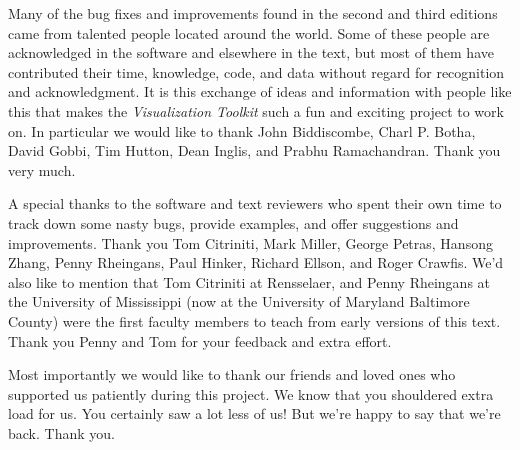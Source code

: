 Many of the bug fixes and improvements found in the second and third editions came from talented people located around the world. Some of these people are acknowledged in the software and elsewhere in the text, but most of them have contributed their time, knowledge, code, and data without regard for recognition and acknowledgment. It is this exchange of ideas and information with people like this that makes the \emph{Visualization Toolkit} such a fun and exciting project to work on. In particular we would like to thank John Biddiscombe, Charl P. Botha, David Gobbi, Tim Hutton, Dean Inglis, and Prabhu Ramachandran. Thank you very much.

A special thanks to the software and text reviewers who spent their own time to track down some nasty bugs, provide examples, and offer suggestions and improvements. Thank you Tom Citriniti, Mark Miller, George Petras, Hansong Zhang, Penny Rheingans, Paul Hinker, Richard Ellson, and Roger Crawfis. We'd also like to mention that Tom Citriniti at Rensselaer, and Penny Rheingans at the University of Mississippi (now at the University of Maryland Baltimore County) were the first faculty members to teach from early versions of this text. Thank you Penny and Tom for your feedback and extra effort.

Most importantly we would like to thank our friends and loved ones who supported us patiently during this project. We know that you shouldered extra load for us. You certainly saw a lot less of us! But we're happy to say that we're back. Thank you.

